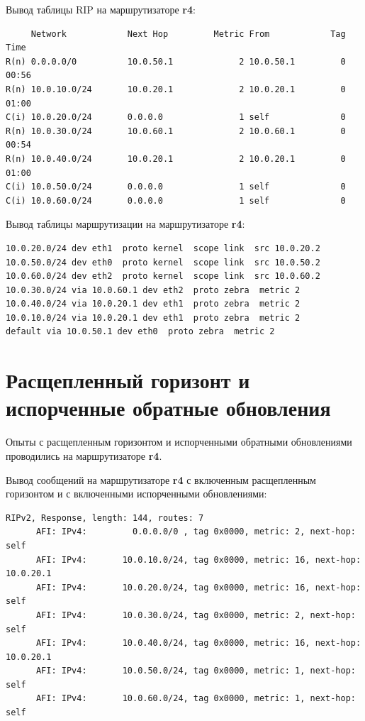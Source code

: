\documentclass[a4paper,12pt]{article}
\begin{document}
Вывод таблицы RIP на маршрутизаторе \textbf{r4}:

\begin{Verbatim}
     Network            Next Hop         Metric From            Tag Time
R(n) 0.0.0.0/0          10.0.50.1             2 10.0.50.1         0 00:56
R(n) 10.0.10.0/24       10.0.20.1             2 10.0.20.1         0 01:00
C(i) 10.0.20.0/24       0.0.0.0               1 self              0
R(n) 10.0.30.0/24       10.0.60.1             2 10.0.60.1         0 00:54
R(n) 10.0.40.0/24       10.0.20.1             2 10.0.20.1         0 01:00
C(i) 10.0.50.0/24       0.0.0.0               1 self              0
C(i) 10.0.60.0/24       0.0.0.0               1 self              0
\end{Verbatim}

Вывод таблицы маршрутизации на маршрутизаторе \textbf{r4}:

\begin{Verbatim}
10.0.20.0/24 dev eth1  proto kernel  scope link  src 10.0.20.2 
10.0.50.0/24 dev eth0  proto kernel  scope link  src 10.0.50.2 
10.0.60.0/24 dev eth2  proto kernel  scope link  src 10.0.60.2 
10.0.30.0/24 via 10.0.60.1 dev eth2  proto zebra  metric 2 
10.0.40.0/24 via 10.0.20.1 dev eth1  proto zebra  metric 2 
10.0.10.0/24 via 10.0.20.1 dev eth1  proto zebra  metric 2 
default via 10.0.50.1 dev eth0  proto zebra  metric 2 
\end{Verbatim}

\section{Расщепленный горизонт и испорченные обратные обновления}

Опыты с расщепленным горизонтом и испорченными обратными обновлениями проводились на маршрутизаторе \textbf{r4}.

Вывод сообщений на маршрутизаторе \textbf{r4} с включенным расщепленным горизонтом и с включенными испорченными обновлениями:

\begin{Verbatim}
RIPv2, Response, length: 144, routes: 7
	  AFI: IPv4:         0.0.0.0/0 , tag 0x0000, metric: 2, next-hop: self
	  AFI: IPv4:       10.0.10.0/24, tag 0x0000, metric: 16, next-hop: 10.0.20.1
	  AFI: IPv4:       10.0.20.0/24, tag 0x0000, metric: 16, next-hop: self
	  AFI: IPv4:       10.0.30.0/24, tag 0x0000, metric: 2, next-hop: self
	  AFI: IPv4:       10.0.40.0/24, tag 0x0000, metric: 16, next-hop: 10.0.20.1
	  AFI: IPv4:       10.0.50.0/24, tag 0x0000, metric: 1, next-hop: self
	  AFI: IPv4:       10.0.60.0/24, tag 0x0000, metric: 1, next-hop: self
\end{Verbatim}
\end{document}
